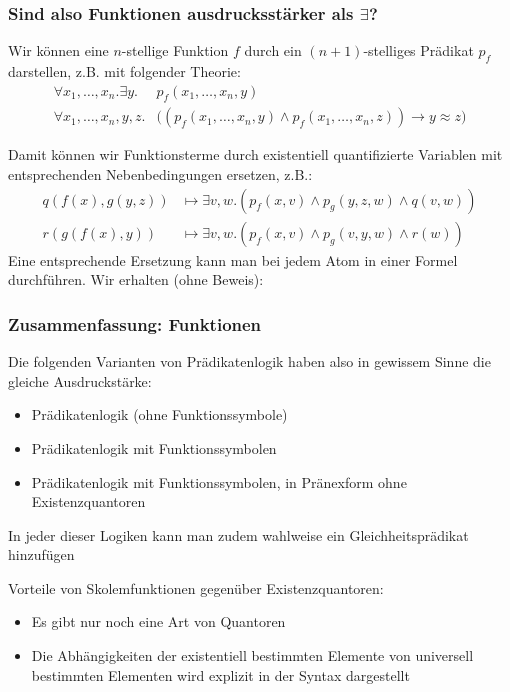 \documentclass[onlymath]{beamer}
\begin{document}
\begin{frame}\frametitle{Sind also Funktionen ausdrucksstärker als $\exists$?}
\pause

Wir können eine $n$-stellige Funktion $f$ durch ein $(n+1)$-stelliges Prädikat $p_f$
darstellen, z.B. mit folgender Theorie:
\begin{align*}
\forall x_1,\ldots, x_n.\exists y.&p_f(x_1,\ldots,x_n,y)\\
\forall x_1,\ldots, x_n,y,z.&\big((p_f(x_1,\ldots,x_n,y)\wedge p_f(x_1,\ldots,x_n,z))\to y\approx z\big)
\end{align*}\pause

Damit können wir Funktionsterme durch existentiell quantifizierte Variablen mit
entsprechenden Nebenbedingungen ersetzen, z.B.:
\begin{align*}
q(f(x),g(y,z)) &\mapsto \exists v,w.(p_f(x,v)\wedge p_g(y,z,w)\wedge q(v,w))\\
r(g(f(x),y)) &\mapsto \exists v,w.(p_f(x,v)\wedge p_g(v,y,w)\wedge r(w))
\end{align*}\pause
Eine entsprechende Ersetzung kann man bei jedem Atom in einer Formel durchführen. Wir erhalten (ohne Beweis):


\end{frame}

\begin{frame}\frametitle{Zusammenfassung: Funktionen}

Die folgenden Varianten von Prädikatenlogik haben also in gewissem Sinne die \alert{gleiche
Ausdruckstärke:}
\begin{itemize}
\item Prädikatenlogik (ohne Funktionssymbole)
\item Prädikatenlogik mit Funktionssymbolen
\item Prädikatenlogik mit Funktionssymbolen, in Pränexform ohne Existenzquantoren
\end{itemize}
In jeder dieser Logiken kann man zudem wahlweise ein Gleichheitsprädikat hinzufügen
\bigskip\pause

\alert{Vorteile von Skolemfunktionen gegenüber Existenzquantoren:}
\begin{itemize}
\item Es gibt nur noch eine Art von Quantoren
\item Die Abhängigkeiten der existentiell bestimmten Elemente von universell bestimmten Elementen wird explizit in der Syntax dargestellt
\end{itemize}


\end{frame}
\end{document}
